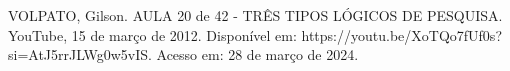 \documentclass[a4paper,12pt,Times]{article}
\newcommand{\keyword}[1]{\textsf{#1}}
\begin{document}

 \onehalfspace  %
 \setlength{\parindent}{1.25cm}






 \newpage
{}
 VOLPATO, Gilson. AULA 20 de 42 - TRÊS TIPOS LÓGICOS DE PESQUISA. YouTube, 15 de março de 2012. Disponível em: https://youtu.be/XoTQo7fUf0s?si=AtJ5rrJLWg0w5vIS. Acesso em: 28 de março de 2024.
\end{document}
